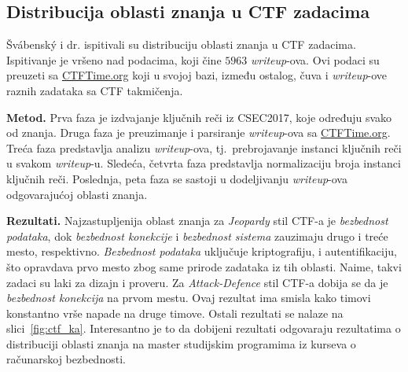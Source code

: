 \documentclass[12pt, a4paper, twocolumn]{article}
\begin{document}
\subsection{Distribucija oblasti znanja u CTF zadacima}

Švábenský i dr.\cite{ctf_skills} ispitivali su distribuciju oblasti znanja u 
CTF zadacima. Ispitivanje je vršeno nad podacima, koji čine $5963$ 
\emph{writeup}-ova. Ovi podaci su preuzeti sa \url{CTFTime.org} koji u svojoj 
bazi, između ostalog, čuva i \emph{writeup}-ove raznih zadataka sa CTF 
takmičenja.\cite{ctf_time}

\textbf{Metod.} Prva faza je izdvajanje ključnih reči iz CSEC2017, koje 
određuju svako od znanja. Druga faza je preuzimanje i parsiranje 
\emph{writeup}-ova sa \url{CTFTime.org}. Treća faza predstavlja analizu 
\emph{writeup}-ova, tj.\ prebrojavanje instanci ključnih reči u svakom 
\emph{writeup}-u. Sledeća, četvrta faza predstavlja normalizaciju 
broja instanci ključnih reči. Poslednja, peta faza se sastoji u dodeljivanju 
\emph{writeup}-ova odgovarajućoj oblasti znanja.\cite{ctf_skills}

\textbf{Rezultati.} Najzastupljenija oblast znanja za \emph{Jeopardy} stil
CTF-a je \emph{bezbednost podataka}, dok \emph{bezbednost konekcije} i 
\emph{bezbednost sistema} zauzimaju drugo i treće mesto, respektivno. 
\emph{Bezbednost podataka} uključuje kriptografiju, i autentifikaciju, 
što opravdava prvo mesto zbog same prirode zadataka iz tih oblasti. Naime,
takvi zadaci su laki za dizajn i proveru. Za \emph{Attack-Defence} stil CTF-a
dobija se da je \emph{bezbednost konekcija} na prvom mestu. Ovaj rezultat ima
smisla kako timovi konstantno vrše napade na druge timove. Ostali rezultati 
se nalaze na slici~\ref{fig:ctf_ka}.\cite{ctf_skills} Interesantno je to da
dobijeni rezultati odgovaraju rezultatima o distribuciji oblasti znanja na 
master studijskim programima iz kurseva o računarskoj 
bezbednosti.\cite{oth_ka, ctf_skills}
\end{document}
